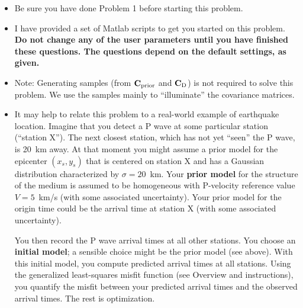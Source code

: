 \documentclass[11pt,titlepage,fleqn]{article}
\begin{document}
\begin{itemize}
\item Be sure you have done Problem 1 before starting this problem.

\item I have provided a set of Matlab scripts to get you started on this problem. {\bf Do not change any of the user parameters until you have finished these questions. The questions depend on the default settings, as given.}

\item Note: Generating samples (from $\mbox{${\bf C}$}_{\rm prior}$ and $\mbox{${\bf C}$}_{\rm D}$) is not required to solve this problem. We use the samples mainly to ``illuminate'' the covariance matrices.

\item It may help to relate this problem to a real-world example of earthquake location. Imagine that you detect a P wave at some particular station (``station X''). The next closest station, which has not yet ``seen'' the P wave, is 20~km away. At that moment you might assume a prior model for the epicenter $(x_s, y_s)$ that is centered on station X and has a Gaussian distribution characterized by $\sigma = 20$~km. 
Your {\bf prior model} for the structure of the medium is assumed to be homogeneous with P-velocity reference value $V = 5$~km/s (with some associated uncertainty). Your prior model for the origin time could be the arrival time at station X (with some associated uncertainty).

You then record the P wave arrival times at all other stations. You choose an {\bf initial model}; a sensible choice might be the prior model (see above). With this initial model, you compute predicted arrival times at all stations. Using the generalized least-squares misfit function (see Overview and instructions), you quantify the misfit between your predicted arrival times and the observed arrival times. The rest is optimization.

\end{itemize}

\end{document}
